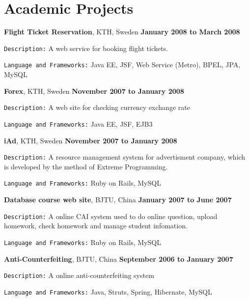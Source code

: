 \section{Academic Projects}
\textbf{Flight Ticket Reservation}, KTH, Sweden \hfill \textbf{January 2008 to March 2008}
\begin{outerlist}
\item \texttt{Description:}
A web service for booking flight tickets.
\item \texttt{Language and Frameworks:}
Java EE, JSF, Web Service (Metro), BPEL, JPA, MySQL 
\end{outerlist}

\blankline

\textbf{Forex}, KTH, Sweden \hfill \textbf{November 2007 to January 2008}
\begin{outerlist}
\item \texttt{Description:}
A web site for checking currency exchange rate
\item \texttt{Language and Frameworks:}
Java EE, JSF, EJB3
\end{outerlist}

\blankline

\textbf{iAd}, KTH, Sweden \hfill \textbf{November 2007 to January 2008}
\begin{outerlist}
\item \texttt{Description:}
A resource management system for advertisment company, which is developed by the method of Extreme Programming.
\item \texttt{Language and Frameworks:}
Ruby on Rails, MySQL
\end{outerlist}

\blankline

\textbf{Database course web site}, BJTU, China \hfill \textbf{January 2007 to June 2007}
\begin{outerlist}
\item \texttt{Description:}
A online CAI system used to do online question, upload homework, check homework and manage student infomation.
\item \texttt{Language and Frameworks:}
Ruby on Rails, MySQL
\end{outerlist}

\blankline

\textbf{Anti-Counterfeiting}, BJTU, China \hfill \textbf{September 2006 to January 2007}
\begin{outerlist}
\item \texttt{Description:}
A online anti-counterfeiting system
\item \texttt{Language and Frameworks:}
Java, Struts, Spring, Hibernate, MySQL
\end{outerlist}

